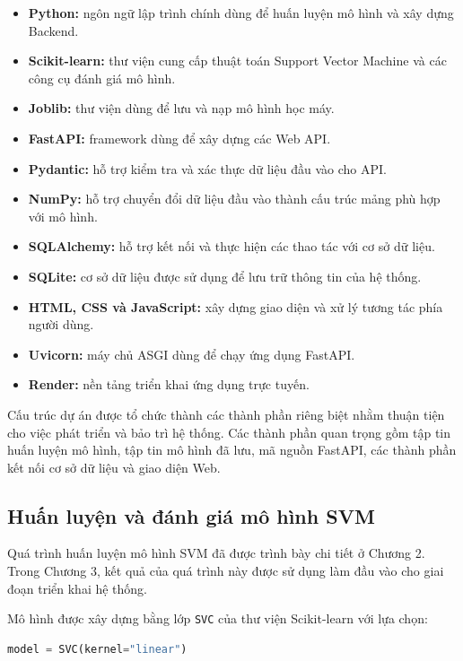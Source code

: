 \documentclass[14pt]{extarticle}
\begin{document}
	\begin{itemize}[leftmargin=*]
		\item \textbf{Python:} ngôn ngữ lập trình chính dùng để huấn luyện mô hình và xây dựng Backend.
		\item \textbf{Scikit-learn:} thư viện cung cấp thuật toán Support Vector Machine và các công cụ đánh giá mô hình.
		\item \textbf{Joblib:} thư viện dùng để lưu và nạp mô hình học máy.
		\item \textbf{FastAPI:} framework dùng để xây dựng các Web API.
		\item \textbf{Pydantic:} hỗ trợ kiểm tra và xác thực dữ liệu đầu vào cho API.
		\item \textbf{NumPy:} hỗ trợ chuyển đổi dữ liệu đầu vào thành cấu trúc mảng phù hợp với mô hình.
		\item \textbf{SQLAlchemy:} hỗ trợ kết nối và thực hiện các thao tác với cơ sở dữ liệu.
		\item \textbf{SQLite:} cơ sở dữ liệu được sử dụng để lưu trữ thông tin của hệ thống.
		\item \textbf{HTML, CSS và JavaScript:} xây dựng giao diện và xử lý tương tác phía người dùng.
		\item \textbf{Uvicorn:} máy chủ ASGI dùng để chạy ứng dụng FastAPI.
		\item \textbf{Render:} nền tảng triển khai ứng dụng trực tuyến.
	\end{itemize}
	
	\noindent Cấu trúc dự án được tổ chức thành các thành phần riêng biệt nhằm thuận tiện cho việc phát triển và bảo trì hệ thống. Các thành phần quan trọng gồm tập tin huấn luyện mô hình, tập tin mô hình đã lưu, mã nguồn FastAPI, các thành phần kết nối cơ sở dữ liệu và giao diện Web.
	
	
	
	\subsection{Huấn luyện và đánh giá mô hình SVM}
	
	\noindent Quá trình huấn luyện mô hình SVM đã được trình bày chi tiết ở Chương 2. Trong Chương 3, kết quả của quá trình này được sử dụng làm đầu vào cho giai đoạn triển khai hệ thống.
	
	\noindent Mô hình được xây dựng bằng lớp \texttt{SVC} của thư viện Scikit-learn với lựa chọn:
	
	\begin{lstlisting}[language=Python, numbers=none]
		model = SVC(kernel="linear")
	\end{lstlisting}
	
\end{document}
